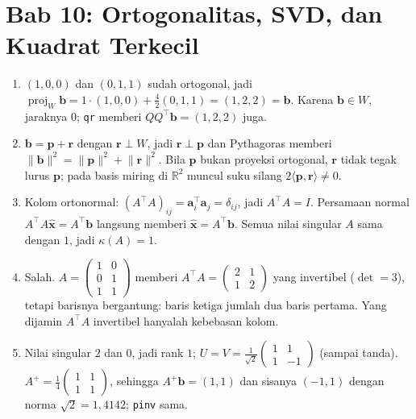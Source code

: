 \section*{Bab 10: Ortogonalitas, SVD, dan Kuadrat Terkecil}
\begin{enumerate}[label=\textbf{10.\arabic*}]
  \item $(1,0,0)$ dan $(0,1,1)$ sudah ortogonal, jadi
        $\operatorname{proj}_{W}\mathbf{b}=1\cdot(1,0,0)+\frac{4}{2}(0,1,1)
        =(1,2,2)=\mathbf{b}$. Karena $\mathbf{b}\in W$, jaraknya $0$;
        \texttt{qr} memberi $QQ^{\top}\mathbf{b}=(1,2,2)$ juga.

  \item $\mathbf{b}=\mathbf{p}+\mathbf{r}$ dengan $\mathbf{r}\perp W$, jadi
        $\mathbf{r}\perp\mathbf{p}$ dan Pythagoras memberi
        $\lVert\mathbf{b}\rVert^{2}=\lVert\mathbf{p}\rVert^{2}
        +\lVert\mathbf{r}\rVert^{2}$. Bila $\mathbf{p}$ bukan proyeksi
        ortogonal, $\mathbf{r}$ tidak tegak lurus $\mathbf{p}$; pada basis miring
        di $\mathbb{R}^{2}$ muncul suku silang $2\langle\mathbf{p},\mathbf{r}
        \rangle\ne0$.

  \item Kolom ortonormal: $(A^{\top}A)_{ij}=\mathbf{a}_{i}^{\top}\mathbf{a}_{j}
        =\delta_{ij}$, jadi $A^{\top}A=I$. Persamaan normal
        $A^{\top}A\hat{\mathbf{x}}=A^{\top}\mathbf{b}$ langsung memberi
        $\hat{\mathbf{x}}=A^{\top}\mathbf{b}$. Semua nilai singular $A$ sama
        dengan $1$, jadi $\kappa(A)=1$.

  \item Salah. $A=\begin{pmatrix}1&0\\0&1\\1&1\end{pmatrix}$ memberi
        $A^{\top}A=\begin{pmatrix}2&1\\1&2\end{pmatrix}$ yang invertibel
        ($\det=3$), tetapi barisnya bergantung: baris ketiga jumlah dua baris
        pertama. Yang dijamin $A^{\top}A$ invertibel hanyalah kebebasan kolom.

  \item Nilai singular $2$ dan $0$, jadi rank $1$;
        $U=V=\frac{1}{\sqrt2}\begin{pmatrix}1&1\\1&-1\end{pmatrix}$ (sampai
        tanda). $A^{+}=\frac14\begin{pmatrix}1&1\\1&1\end{pmatrix}$, sehingga
        $A^{+}\mathbf{b}=(1,1)$ dan sisanya $(-1,1)$ dengan norma
        $\sqrt2=1{,}4142$; \texttt{pinv} sama.


\end{enumerate}
